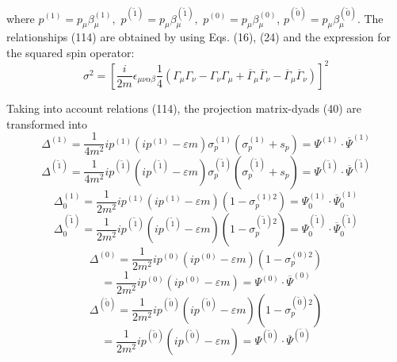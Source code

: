 \documentclass[a4paper,12pt]{article}
\begin{document}
where $p^{(1)}=p_\mu \beta _\mu ^{(1)},$
$p^{(\widetilde{1})}=p_\mu \beta _\mu ^{(\widetilde{1})},$
$p^{(0)}=p_\mu \beta _\mu ^{(0)}$, $p^{(\widetilde{ 0})}=p_\mu
\beta _\mu ^{(\widetilde{0})}$. The relationships (114) are
obtained by using Eqs. (16), (24) and the expression for the
squared spin operator:
\begin{equation}
\sigma ^2=\left[ \frac i{2m}\epsilon _{\mu \nu \alpha \beta }\frac 14\left(
\Gamma _\mu \Gamma _\nu -\Gamma _\nu \Gamma _\mu +\overline{\Gamma }_\mu
\overline{\Gamma }_\nu -\overline{\Gamma }_\mu \overline{\Gamma }_\nu
\right) \right] ^2  \label{115}
\end{equation}

Taking into account relations (114), the projection matrix-dyads (40) are
transformed into
\begin{equation}
\Delta ^{(1)}=\frac 1{4m^2}ip^{(1)}\left( ip^{(1)}-\varepsilon
m\right) \sigma _p^{(1)}\left( \sigma _p^{(1)}+s_p\right) =\Psi
^{(1)}\cdot \overline{ \Psi }^{(1)}  \label{116}
\end{equation}
\begin{equation}
\Delta ^{(\widetilde{1})}=\frac 1{4m^2}ip^{(\widetilde{1})}\left(
ip^{( \widetilde{1})}-\varepsilon m\right) \sigma
_p^{(\widetilde{1})}\left( \sigma _p^{(\widetilde{1})}+s_p\right)
=\Psi ^{(\widetilde{1})}\cdot \overline{\Psi }^{(\widetilde{1})}
\label{117}
\end{equation}
\begin{equation}
\Delta _0^{(1)}=\frac 1{2m^2}ip^{(1)}\left( ip^{(1)}-\varepsilon m\right)
\left( 1-\sigma _p^{(1)2}\right) =\Psi _0^{(1)}\cdot \overline{\Psi }_0^{(1)}
\label{118}
\end{equation}
\begin{equation}
\Delta _0^{(\widetilde{1})}=\frac
1{2m^2}ip^{(\widetilde{1})}\left( ip^{(
\widetilde{1})}-\varepsilon m\right) \left( 1-\sigma
_p^{(\widetilde{1} )2}\right) =\Psi _0^{(\widetilde{1})}\cdot
\overline{\Psi }_0^{(\widetilde{1} )}  \label{119}
\end{equation}
\[
\Delta ^{(0)}=\frac 1{2m^2}ip^{(0)}\left( ip^{(0)}-\varepsilon m\right)
\left( 1-\sigma _p^{(0)2}\right)
\]
\begin{equation}
=\frac 1{2m^2}ip^{(0)}\left( ip^{(0)}-\varepsilon m\right) =\Psi ^{(0)}\cdot
\overline{\Psi }^{(0)}  \label{120}
\end{equation}
\[
\Delta ^{(\widetilde{0})}=\frac 1{2m^2}ip^{(\widetilde{0})}\left(
ip^{( \widetilde{0})}-\varepsilon m\right) \left( 1-\sigma
_p^{(\widetilde{0} )2}\right)
\]
\begin{equation}
=\frac 1{2m^2}ip^{(\widetilde{0})}\left( ip^{(\widetilde{0})}-\varepsilon
m\right) =\Psi ^{(\widetilde{0})}\cdot \overline{\Psi }^{(\widetilde{0})}
\label{121}
\end{equation}
\end{document}
